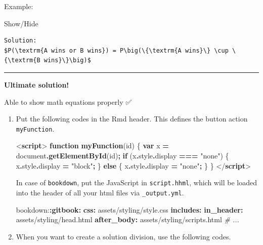 \documentclass[
]{book}
\newenvironment{Shaded}{\begin{snugshade}}{\end{snugshade}}
\newcommand{\AttributeTok}[1]{\textcolor[rgb]{0.13,0.29,0.53}{#1}}
\newcommand{\BuiltInTok}[1]{#1}
\newcommand{\CommentTok}[1]{\textcolor[rgb]{0.56,0.35,0.01}{\textit{#1}}}
\newcommand{\ControlFlowTok}[1]{\textcolor[rgb]{0.13,0.29,0.53}{\textbf{#1}}}
\newcommand{\DataTypeTok}[1]{\textcolor[rgb]{0.13,0.29,0.53}{#1}}
\newcommand{\FunctionTok}[1]{\textcolor[rgb]{0.13,0.29,0.53}{\textbf{#1}}}
\newcommand{\KeywordTok}[1]{\textcolor[rgb]{0.13,0.29,0.53}{\textbf{#1}}}
\newcommand{\NormalTok}[1]{#1}
\newcommand{\OperatorTok}[1]{\textcolor[rgb]{0.81,0.36,0.00}{\textbf{#1}}}
\newcommand{\StringTok}[1]{\textcolor[rgb]{0.31,0.60,0.02}{#1}}
\theoremstyle{definition}
\theoremstyle{definition}
\theoremstyle{definition}
\theoremstyle{definition}
\theoremstyle{remark}
\begin{document}
Example:

Show/Hide

\label{target2}
\begin{verbatim}
Solution:
$P(\textrm{A wins or B wins}) = P\big(\{\textrm{A wins}\} \cup \{\textrm{B wins}\}\big)$
\end{verbatim}

\begin{center}\rule{0.5\linewidth}{0.5pt}\end{center}

{\textbf{Ultimate solution!} }

Able to show math equations properly ✅

\begin{enumerate}
\def\labelenumi{\arabic{enumi}.}
\item
  Put the following codes in the Rmd {header}. This defines the button action \texttt{myFunction}.

\begin{Shaded}
\begin{Highlighting}[]
\DataTypeTok{\textless{}}\KeywordTok{script}\DataTypeTok{\textgreater{}} 
    \KeywordTok{function} \FunctionTok{myFunction}\NormalTok{(id) \{}
      \KeywordTok{var}\NormalTok{ x }\OperatorTok{=} \BuiltInTok{document}\OperatorTok{.}\FunctionTok{getElementById}\NormalTok{(id)}\OperatorTok{;} 
      \ControlFlowTok{if}\NormalTok{ (x}\OperatorTok{.}\AttributeTok{style}\OperatorTok{.}\AttributeTok{display} \OperatorTok{===} \StringTok{"none"}\NormalTok{) \{}
\NormalTok{        x}\OperatorTok{.}\AttributeTok{style}\OperatorTok{.}\AttributeTok{display} \OperatorTok{=} \StringTok{"block"}\OperatorTok{;}
\NormalTok{      \} }\ControlFlowTok{else}\NormalTok{ \{}
\NormalTok{        x}\OperatorTok{.}\AttributeTok{style}\OperatorTok{.}\AttributeTok{display} \OperatorTok{=} \StringTok{"none"}\OperatorTok{;}
\NormalTok{      \}}
\NormalTok{    \}}
\DataTypeTok{\textless{}/}\KeywordTok{script}\DataTypeTok{\textgreater{}}
\end{Highlighting}
\end{Shaded}

  In case of \texttt{bookdown}, put the JavaScript in \texttt{script.hhml}, which will be loaded into the header of all your html files via \texttt{\_output.yml}.

\begin{Shaded}
\begin{Highlighting}[]
\AttributeTok{bookdown:}\FunctionTok{:gitbook}\KeywordTok{:}
\AttributeTok{  }\FunctionTok{css}\KeywordTok{:}\AttributeTok{ assets/styling/style.css}
\AttributeTok{  }\FunctionTok{includes}\KeywordTok{:}
\AttributeTok{    }\FunctionTok{in\_header}\KeywordTok{:}\AttributeTok{ assets/styling/head.html}
\AttributeTok{    }\FunctionTok{after\_body}\KeywordTok{:}\AttributeTok{ assets/styling/scripts.html}
\CommentTok{  \# ...}
\end{Highlighting}
\end{Shaded}
\item
  When you want to create a solution division, use the following codes.


\end{enumerate}
\end{document}
